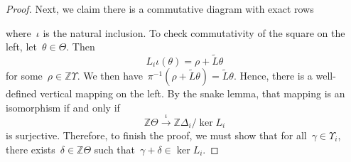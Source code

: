 \documentclass[12pt]{article}
\newcommand{\Z}{\mathbb{Z}}
\DeclareMathOperator{\crit}{\mathcal{K}}
\DeclareMathOperator{\cok}{\mathrm{cok}}
\theoremstyle{definition}
\theoremstyle{remark}
\begin{document}
\begin{proof}
  Next, we claim there is a commutative diagram with exact rows
  \begin{center}
  \end{center}
  where~$\iota$ is the natural inclusion.  To check commutativity of the square
  on the left, let~$\theta\in\Theta$.  Then
  \[
    L_i\iota(\theta)=\rho+\tilde{L}\theta
  \]
  for some~$\rho\in\Z\Upsilon$.  We then
  have~$\pi^{-1}(\rho+\tilde{L}\theta)=\tilde{L}\theta$.  Hence, there is a
  well-defined vertical mapping on the left.  By the snake lemma, that mapping is
  an isomorphism if and only if
  \[
    \Z\Theta\xrightarrow{\iota}\Z\Delta_i/\ker L_i
  \]
  is surjective.  Therefore, to finish the proof, we must show that for
  all~$\gamma\in\Upsilon_i$, there exists~$\delta\in\Z\Theta$ such
  that~$\gamma+\delta\in\ker L_i$.


\end{proof}
\end{document}
